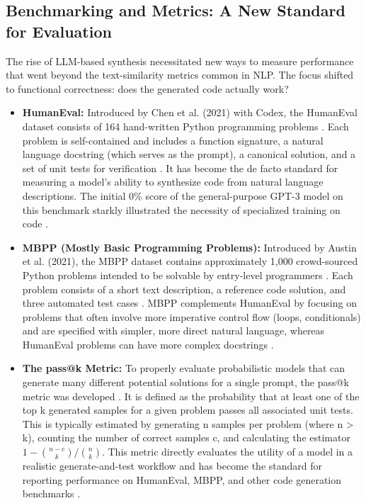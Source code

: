 \documentclass[12pt, a4paper]{report}
\begin{document}
\subsection{Benchmarking and Metrics: A New Standard for Evaluation}

The rise of LLM-based synthesis necessitated new ways to measure performance that went beyond the text-similarity metrics common in NLP. The focus shifted to functional correctness: does the generated code actually work?

\begin{itemize}
    \item \textbf{HumanEval:} Introduced by Chen et al. (2021) with Codex, the HumanEval dataset consists of 164 hand-written Python programming problems \citep{chen2021evaluating}. Each problem is self-contained and includes a function signature, a natural language docstring (which serves as the prompt), a canonical solution, and a set of unit tests for verification \citep{chen2021evaluating}. It has become the de facto standard for measuring a model's ability to synthesize code from natural language descriptions. The initial 0\% score of the general-purpose GPT-3 model on this benchmark starkly illustrated the necessity of specialized training on code \citep{chen2021evaluating}.
    
    \item \textbf{MBPP (Mostly Basic Programming Problems):} Introduced by Austin et al. (2021), the MBPP dataset contains approximately 1,000 crowd-sourced Python problems intended to be solvable by entry-level programmers \citep{austin2021multilingual}. Each problem consists of a short text description, a reference code solution, and three automated test cases \citep{austin2021multilingual}. MBPP complements HumanEval by focusing on problems that often involve more imperative control flow (loops, conditionals) and are specified with simpler, more direct natural language, whereas HumanEval problems can have more complex docstrings \citep{austin2021multilingual}.
    
    \item \textbf{The pass@k Metric:} To properly evaluate probabilistic models that can generate many different potential solutions for a single prompt, the pass@k metric was developed \citep{chen2021evaluating}. It is defined as the probability that at least one of the top k generated samples for a given problem passes all associated unit tests. This is typically estimated by generating n samples per problem (where n > k), counting the number of correct samples c, and calculating the estimator $1 - \binom{n-c}{k} / \binom{n}{k}$. This metric directly evaluates the utility of a model in a realistic generate-and-test workflow and has become the standard for reporting performance on HumanEval, MBPP, and other code generation benchmarks \citep{chen2021evaluating}.
\end{itemize}
\end{document}
